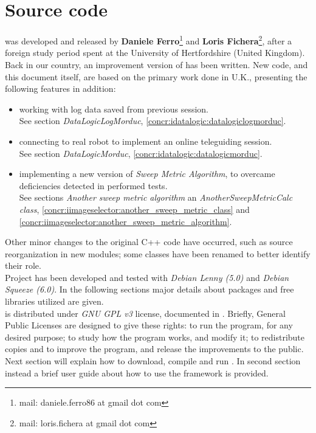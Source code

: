 \setcounter{figure}{0}
\setcounter{table}{0}
\setcounter{lstlisting}{0}

\chapter{Source code}
\label{sourcecode}
\minitoc

\framework{} was developed and released
by \textbf{Daniele Ferro}\footnote{mail: daniele.ferro86
at gmail dot com}
and
\textbf{Loris Fichera}\footnote{mail: loris.fichera
at gmail dot com}, after
a foreign study
period spent at the University of Hertfordshire (United Kingdom).
\\
Back in our country, an improvement version of \framework{} has
been written.
New code, and this document itself, are based on the primary
work done in U.K., presenting the following features in
addition:

\begin{itemize}

\item working with log data saved from previous
      \morduc{} session. \\
      See section \textit{DataLogicLogMorduc},
      \ref{concr:idatalogic:datalogiclogmorduc}.
      

\item connecting to real \morduc{} robot to implement
      an online teleguiding session. \\
      See section \textit{DataLogicMorduc},
      \ref{concr:idatalogic:datalogicmorduc}.

\item implementing a new version of \textit{Sweep Metric
      Algorithm}, to overcame deficiencies detected in
      performed tests. \\
      See sections \textit{Another sweep metric algorithm}
      an \textit{AnotherSweepMetricCalc class},
      \ref{concr:iimageselector:another_sweep_metric_class}
      and
      \ref{concr:iimageselector:another_sweep_metric_algorithm}.

\end{itemize}

Other minor changes to the original C++ code have occurred, such
as source reorganization in new modules; some classes have
been renamed to better identify their role.
\\
Project has been developed and tested with \textit{Debian Lenny (5.0)}
and \textit{Debian Squeeze (6.0)}. In the following sections major
details about packages and free libraries utilized are given.
\\
\framework{} is distributed under \textit{GNU GPL v3} license, 
documented in \cite{license:gplv3}. 
Briefly, General Public Licenses are designed to give these rights: to run the
program, for any desired purpose; to study how the program works, and
modify it; to redistribute copies and to improve the program, and
release the improvements to the public.
\\
Next section will explain how to download, compile and
run \framework{}. In second section instead a brief user guide
about how to use the framework is provided.

\clearpage


\clearpage


